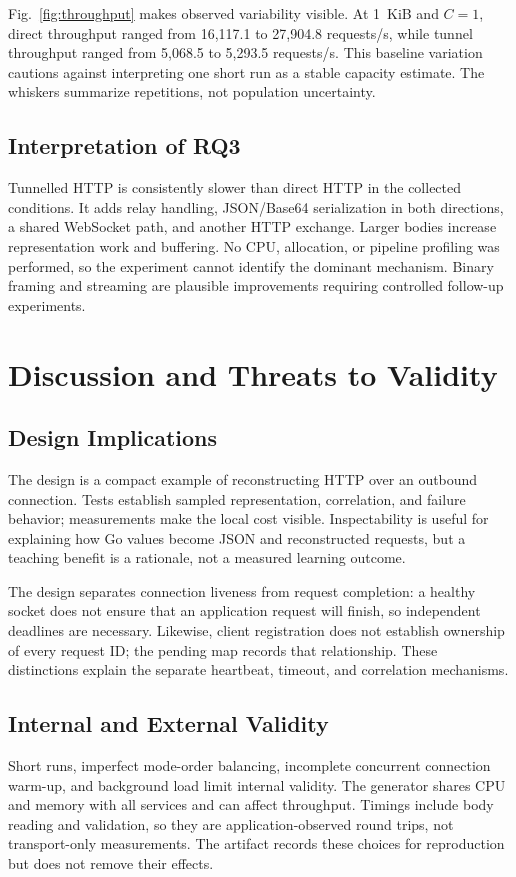 \documentclass[conference,letterpaper]{IEEEtran}
\begin{document}
Fig.~\ref{fig:throughput} makes observed variability visible. At 1~KiB and
$C=1$, direct throughput ranged from 16,117.1 to 27,904.8 requests/s, while
tunnel throughput ranged from 5,068.5 to 5,293.5 requests/s. This baseline
variation cautions against interpreting one short run as a stable capacity
estimate. The whiskers summarize repetitions, not population uncertainty.

\subsection{Interpretation of RQ3}
Tunnelled HTTP is consistently slower than direct HTTP in the collected
conditions. It adds relay handling, JSON/Base64 serialization in both
directions, a shared WebSocket path, and another HTTP exchange. Larger bodies
increase representation work and buffering. No CPU, allocation, or pipeline
profiling was performed, so the experiment cannot identify the dominant
mechanism. Binary framing and streaming are plausible improvements requiring
controlled follow-up experiments.

\section{Discussion and Threats to Validity}
\subsection{Design Implications}
The design is a compact example of reconstructing HTTP over an outbound
connection. Tests establish sampled representation, correlation, and failure
behavior; measurements make the local cost visible. Inspectability is useful
for explaining how Go values become JSON and reconstructed requests, but a
teaching benefit is a rationale, not a measured learning outcome.

The design separates connection liveness from request completion: a healthy
socket does not ensure that an application request will finish, so independent
deadlines are necessary. Likewise, client registration does not establish
ownership of every request ID; the pending map records that relationship.
These distinctions explain the separate heartbeat, timeout, and correlation
mechanisms.

\subsection{Internal and External Validity}
Short runs, imperfect mode-order balancing, incomplete concurrent connection
warm-up, and background load limit internal validity. The generator shares
CPU and memory with all services and can affect throughput. Timings include
body reading and validation, so they are application-observed round trips,
not transport-only measurements. The artifact records these choices for
reproduction but does not remove their effects.
\end{document}
